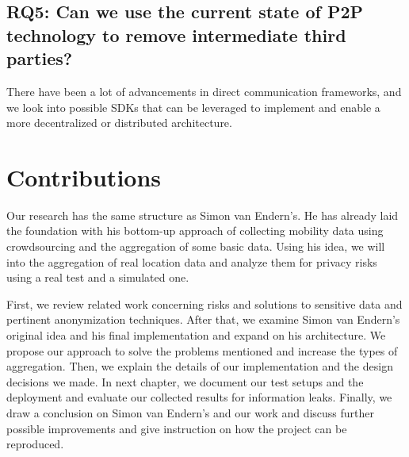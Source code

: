 \subsection*{RQ5: Can we use the current state of P2P technology to remove intermediate third parties?}
There have been a lot of advancements in direct communication frameworks, and we look into possible SDKs that can be leveraged to implement and enable a more decentralized or distributed architecture.

\section{Contributions}

Our research has the same structure as Simon van Endern's. He has already laid the foundation with his bottom-up approach of collecting mobility data using crowdsourcing and the aggregation of some basic data. Using his idea, we will into the aggregation of real location data and analyze them for privacy risks using a real test and a simulated one.


First, we review related work concerning risks and solutions to sensitive data and pertinent anonymization techniques. After that, we examine Simon van Endern's original idea and his final implementation and expand on his architecture. We propose our approach to solve the  problems mentioned and increase the types of aggregation. Then, we explain the details of our implementation and the design decisions we made. In next chapter, we document our test setups and the deployment and evaluate our collected results for information leaks. Finally, we draw a conclusion on Simon van Endern's and our work and discuss further possible improvements and give instruction on how the project can be reproduced.
